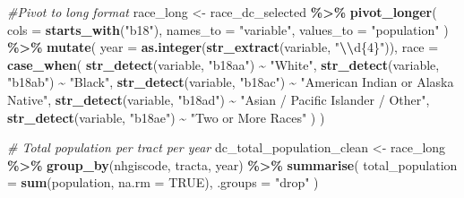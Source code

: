 \documentclass[
]{article}
\newenvironment{Shaded}{\begin{snugshade}}{\end{snugshade}}
\newcommand{\AttributeTok}[1]{\textcolor[rgb]{0.13,0.29,0.53}{#1}}
\newcommand{\CommentTok}[1]{\textcolor[rgb]{0.56,0.35,0.01}{\textit{#1}}}
\newcommand{\ConstantTok}[1]{\textcolor[rgb]{0.56,0.35,0.01}{#1}}
\newcommand{\FunctionTok}[1]{\textcolor[rgb]{0.13,0.29,0.53}{\textbf{#1}}}
\newcommand{\NormalTok}[1]{#1}
\newcommand{\OtherTok}[1]{\textcolor[rgb]{0.56,0.35,0.01}{#1}}
\newcommand{\SpecialCharTok}[1]{\textcolor[rgb]{0.81,0.36,0.00}{\textbf{#1}}}
\newcommand{\StringTok}[1]{\textcolor[rgb]{0.31,0.60,0.02}{#1}}
\begin{document}
\begin{Shaded}
\begin{Highlighting}[]
\CommentTok{\#Pivot to long format}
\NormalTok{race\_long }\OtherTok{\textless{}{-}}\NormalTok{ race\_dc\_selected }\SpecialCharTok{\%\textgreater{}\%}
  \FunctionTok{pivot\_longer}\NormalTok{(}
    \AttributeTok{cols =} \FunctionTok{starts\_with}\NormalTok{(}\StringTok{"b18"}\NormalTok{),}
    \AttributeTok{names\_to =} \StringTok{"variable"}\NormalTok{,}
    \AttributeTok{values\_to =} \StringTok{"population"}
\NormalTok{  ) }\SpecialCharTok{\%\textgreater{}\%}
  \FunctionTok{mutate}\NormalTok{(}
    \AttributeTok{year =} \FunctionTok{as.integer}\NormalTok{(}\FunctionTok{str\_extract}\NormalTok{(variable, }\StringTok{"}\SpecialCharTok{\textbackslash{}\textbackslash{}}\StringTok{d\{4\}"}\NormalTok{)),}
    \AttributeTok{race =} \FunctionTok{case\_when}\NormalTok{(}
      \FunctionTok{str\_detect}\NormalTok{(variable, }\StringTok{"b18aa"}\NormalTok{) }\SpecialCharTok{\textasciitilde{}} \StringTok{"White"}\NormalTok{,}
      \FunctionTok{str\_detect}\NormalTok{(variable, }\StringTok{"b18ab"}\NormalTok{) }\SpecialCharTok{\textasciitilde{}} \StringTok{"Black"}\NormalTok{,}
      \FunctionTok{str\_detect}\NormalTok{(variable, }\StringTok{"b18ac"}\NormalTok{) }\SpecialCharTok{\textasciitilde{}} \StringTok{"American Indian or Alaska Native"}\NormalTok{,}
      \FunctionTok{str\_detect}\NormalTok{(variable, }\StringTok{"b18ad"}\NormalTok{) }\SpecialCharTok{\textasciitilde{}} \StringTok{"Asian / Pacific Islander / Other"}\NormalTok{,}
      \FunctionTok{str\_detect}\NormalTok{(variable, }\StringTok{"b18ae"}\NormalTok{) }\SpecialCharTok{\textasciitilde{}} \StringTok{"Two or More Races"}
\NormalTok{    )}
\NormalTok{  )}

\CommentTok{\# Total population per tract per year}
\NormalTok{dc\_total\_population\_clean }\OtherTok{\textless{}{-}}\NormalTok{ race\_long }\SpecialCharTok{\%\textgreater{}\%}
  \FunctionTok{group\_by}\NormalTok{(nhgiscode, tracta, year) }\SpecialCharTok{\%\textgreater{}\%}
  \FunctionTok{summarise}\NormalTok{(}
    \AttributeTok{total\_population =} \FunctionTok{sum}\NormalTok{(population, }\AttributeTok{na.rm =} \ConstantTok{TRUE}\NormalTok{),}
    \AttributeTok{.groups =} \StringTok{"drop"}
\NormalTok{  )}


\end{Highlighting}
\end{Shaded}
\end{document}
